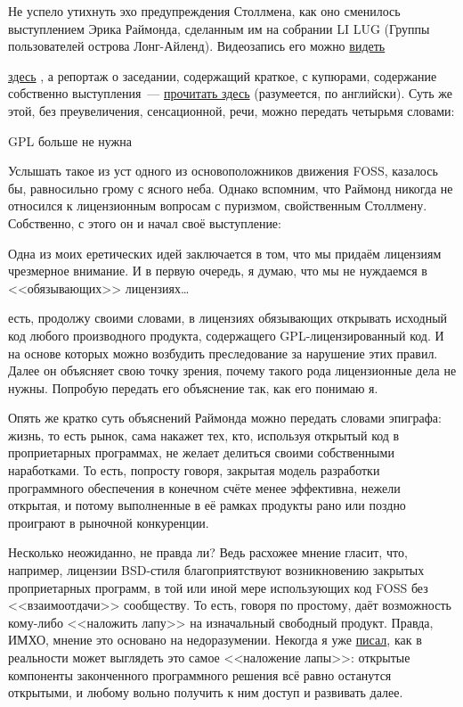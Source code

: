 Не успело утихнуть эхо предупреждения Столлмена, как оно сменилось выступлением Эрика Раймонда, сделанным им на собрании LI LUG (Группы пользователей острова Лонг-Айленд). Видеозапись его можно 
\href{http://www.archive.org/details/LILUG_20090310_ESR}{видеть}
 
\href{http://www.archive.org/details/LILUG_20090310_ESR}{здесь}
, а репортаж о заседании, содержащий краткое, с купюрами, содержание собственно выступления~--- 
\href{http://dotcommie.net/feed/index.php?id=160}{прочитать здесь}
  (разумеется, по английски). Суть же этой, без преувеличения, сенсационной, речи, можно передать четырьмя словами:


\begin{shadequote}{}GPL больше не нужна\end{shadequote}

Услышать такое из уст одного из основоположников движения FOSS, казалось бы, равносильно грому с ясного неба. Однако вспомним, что Раймонд никогда не относился к лицензионным вопросам с пуризмом, свойственным Столлмену. Собственно, с этого он и начал своё выступление:


\begin{shadequote}{}Одна из моих еретических идей заключается в том, что мы придаём лицензиям чрезмерное внимание. И в первую очередь, я думаю, что мы не нуждаемся в <<обязывающих>> лицензиях\dots\end{shadequote}

 есть, продолжу своими словами, в лицензиях обязывающих открывать исходный код любого производного продукта, содержащего GPL-лицензированный код. И на основе которых можно возбудить преследование за нарушение этих правил. Далее он объясняет свою точку зрения, почему такого рода лицензионные дела не нужны. Попробую передать его объяснение так, как его понимаю я.

Опять же кратко суть объяснений Раймонда можно передать словами эпиграфа: жизнь, то есть рынок, сама накажет тех, кто, используя открытый код в проприетарных программах, не желает делиться своими собственными наработками. То есть, попросту говоря, закрытая модель разработки программного обеспечения в конечном счёте менее эффективна, нежели открытая, и потому выполненные в её рамках продукты рано или поздно проиграют в рыночной конкуренции.

Несколько неожиданно, не правда ли? Ведь расхожее мнение гласит, что, например, лицензии BSD-стиля благоприятствуют возникновению закрытых проприетарных программ, в той или иной мере использующих код FOSS без <<взаимоотдачи>> сообществу. То есть, говоря по простому, даёт возможность кому-либо <<наложить лапу>> на изначальный свободный продукт. Правда, ИМХО, мнение это основано на недоразумении. Некогда я уже \href{http://alv.me/?p=279}{писал}, как в реальности может выглядеть это самое <<наложение лапы>>: открытые компоненты законченного программного решения всё равно останутся открытыми, и любому вольно получить к ним доступ и развивать далее.

